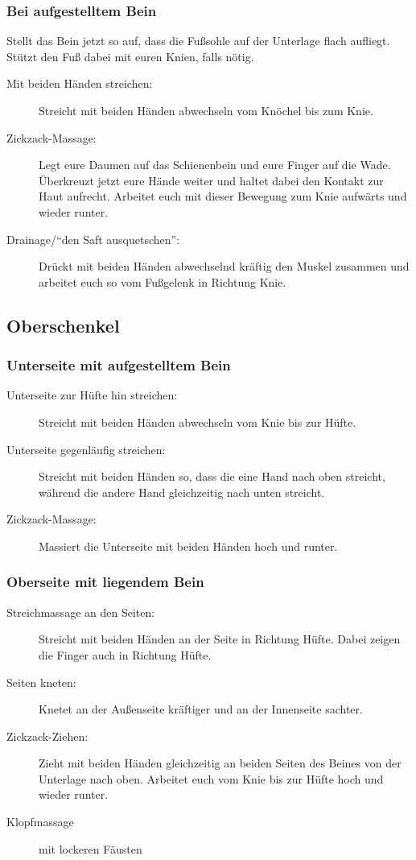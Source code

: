 \subsubsection{Bei aufgestelltem Bein}

Stellt das Bein jetzt so auf, dass die Fußsohle auf der Unterlage flach aufliegt. Stützt den Fuß dabei mit euren Knien, falls nötig.

\begin{description}
  \item [Mit beiden Händen streichen:] Streicht mit beiden Händen abwechseln vom Knöchel bis zum Knie.
  \item [Zickzack-Massage:] Legt eure Daumen auf das Schienenbein und eure Finger auf die Wade. Überkreuzt jetzt eure Hände weiter und haltet dabei den Kontakt zur Haut aufrecht. Arbeitet euch mit dieser Bewegung zum Knie aufwärts und wieder runter.
  \item [Drainage/"`den Saft ausquetschen"':] Drückt mit beiden Händen abwechselnd kräftig den Muskel zusammen und arbeitet euch so vom Fußgelenk in Richtung Knie.
\end{description}

\subsection{Oberschenkel}

\subsubsection{Unterseite mit aufgestelltem Bein}

\begin{description}
  \item [Unterseite zur Hüfte hin streichen:] Streicht mit beiden Händen abwechseln vom Knie bis zur Hüfte.
  \item [Unterseite gegenläufig streichen:] Streicht mit beiden Händen so, dass die eine Hand nach oben streicht, während die andere Hand gleichzeitig nach unten streicht.
  \item [Zickzack-Massage:] Massiert die Unterseite mit beiden Händen hoch und runter.
\end{description}

\subsubsection{Oberseite mit liegendem Bein}

\begin{description}
  \item [Streichmassage an den Seiten:] Streicht mit beiden Händen an der Seite in Richtung Hüfte. Dabei zeigen die Finger auch in Richtung Hüfte.
  \item [Seiten kneten:] Knetet an der Außenseite kräftiger und an der Innenseite sachter.
  \item [Zickzack-Ziehen:] Zieht mit beiden Händen gleichzeitig an beiden Seiten des Beines von der Unterlage nach oben. Arbeitet euch vom Knie bis zur Hüfte hoch und wieder runter.
  \item [Klopfmassage] mit lockeren Fäusten
\end{description}



